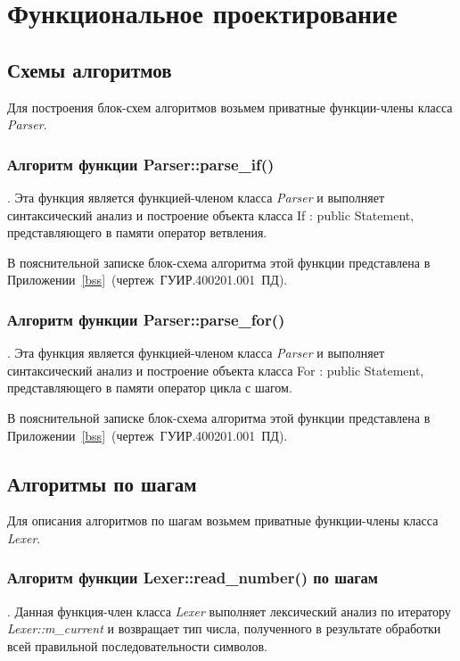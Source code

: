 \section{Функциональное проектирование}

\subsection{Схемы алгоритмов}

Для построения блок-схем алгоритмов возьмем приватные функции-члены класса
\emph{Parser}.

\subsubsection{Алгоритм функции Parser::parse\_if()}.
Эта функция является функцией-членом класса \emph{Parser}
и выполняет синтаксический анализ и построение объекта класса
If : public Statement, представляющего в памяти оператор ветвления.

В пояснительной записке блок-схема алгоритма этой функции
представлена в \mbox{Приложении \ref{bss} (чертеж ГУИР.400201.001 ПД)}. 

\subsubsection{Алгоритм функции Parser::parse\_for()}.
Эта функция является функцией-членом класса \emph{Parser}
и выполняет синтаксический анализ и построение объекта класса
For : public Statement, представляющего в памяти оператор цикла с шагом.

В пояснительной записке блок-схема алгоритма этой функции
представлена в \mbox{Приложении \ref{bss} (чертеж ГУИР.400201.001 ПД)}.

\subsection{Алгоритмы по шагам}

Для описания алгоритмов по шагам возьмем приватные функции-члены класса
\emph{Lexer}.

\subsubsection{Алгоритм функции Lexer::read\_number() по шагам}.
Данная функция-член класса \emph{Lexer} выполняет лексический анализ
по итератору \emph{Lexer::m\_current} и возвращает тип числа,
полученного в результате обработки 
всей правильной последовательности символов.

